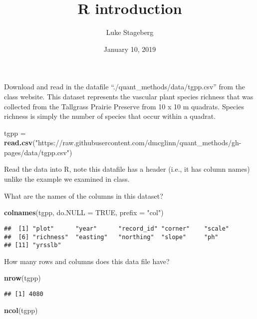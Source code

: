\documentclass[]{article}
\title{R introduction}
\author{Luke Stageberg}
\date{January 10, 2019}
\newenvironment{Shaded}{\begin{snugshade}}{\end{snugshade}}
\newcommand{\KeywordTok}[1]{\textcolor[rgb]{0.13,0.29,0.53}{\textbf{#1}}}
\newcommand{\DataTypeTok}[1]{\textcolor[rgb]{0.13,0.29,0.53}{#1}}
\newcommand{\StringTok}[1]{\textcolor[rgb]{0.31,0.60,0.02}{#1}}
\newcommand{\OtherTok}[1]{\textcolor[rgb]{0.56,0.35,0.01}{#1}}
\newcommand{\NormalTok}[1]{#1}
\begin{document}
\maketitle

Download and read in the datafile ``./quant\_methods/data/tgpp.csv''
from the class website. This dataset represents the vascular plant
species richness that was collected from the Tallgrass Prairie Preserve
from 10 x 10 m quadrats. Species richness is simply the number of
species that occur within a quadrat.

\begin{Shaded}
\begin{Highlighting}[]
\NormalTok{tgpp =}\StringTok{ }\KeywordTok{read.csv}\NormalTok{(}\StringTok{"https://raw.githubusercontent.com/dmcglinn/quant_methods/gh-pages/data/tgpp.csv"}\NormalTok{)}
\end{Highlighting}
\end{Shaded}

Read the data into R, note this datafile has a header (i.e., it has
column names) unlike the example we examined in class.

What are the names of the columns in this dataset?

\begin{Shaded}
\begin{Highlighting}[]
\KeywordTok{colnames}\NormalTok{(tgpp, }\DataTypeTok{do.NULL =} \OtherTok{TRUE}\NormalTok{, }\DataTypeTok{prefix =} \StringTok{"col"}\NormalTok{)}
\end{Highlighting}
\end{Shaded}

\begin{verbatim}
##  [1] "plot"      "year"      "record_id" "corner"    "scale"    
##  [6] "richness"  "easting"   "northing"  "slope"     "ph"       
## [11] "yrsslb"
\end{verbatim}

How many rows and columns does this data file have?

\begin{Shaded}
\begin{Highlighting}[]
\KeywordTok{nrow}\NormalTok{(tgpp)}
\end{Highlighting}
\end{Shaded}

\begin{verbatim}
## [1] 4080
\end{verbatim}

\begin{Shaded}
\begin{Highlighting}[]
\KeywordTok{ncol}\NormalTok{(tgpp)}
\end{Highlighting}
\end{Shaded}
\end{document}
